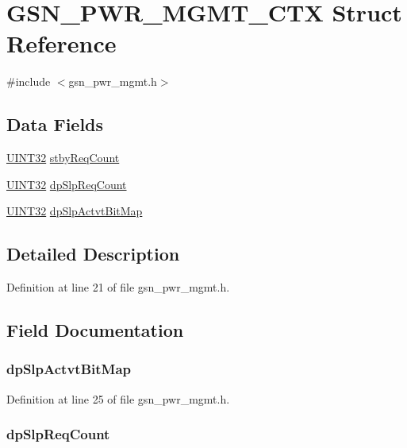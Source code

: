 \hypertarget{a00184}{
\section{GSN\_\-PWR\_\-MGMT\_\-CTX Struct Reference}
\label{a00184}
}


{\ttfamily \#include $<$gsn\_\-pwr\_\-mgmt.h$>$}

\subsection*{Data Fields}
\begin{DoxyCompactItemize}
\item 
\hyperlink{a00660_gae1e6edbbc26d6fbc71a90190d0266018}{UINT32} \hyperlink{a00184_ab6d7cdcd26cd0bfb2c69f920c1ad0737}{stbyReqCount}
\item 
\hyperlink{a00660_gae1e6edbbc26d6fbc71a90190d0266018}{UINT32} \hyperlink{a00184_a3bbab5d44f26e45a21a0b8a0927626f6}{dpSlpReqCount}
\item 
\hyperlink{a00660_gae1e6edbbc26d6fbc71a90190d0266018}{UINT32} \hyperlink{a00184_a582c3418fc7ee4c433ea83472eee9ba9}{dpSlpActvtBitMap}
\end{DoxyCompactItemize}


\subsection{Detailed Description}


Definition at line 21 of file gsn\_\-pwr\_\-mgmt.h.



\subsection{Field Documentation}
\hypertarget{a00184_a582c3418fc7ee4c433ea83472eee9ba9}{
\subsubsection[{dpSlpActvtBitMap}]{ {\bf dpSlpActvtBitMap}}}
\label{a00184_a582c3418fc7ee4c433ea83472eee9ba9}


Definition at line 25 of file gsn\_\-pwr\_\-mgmt.h.

\hypertarget{a00184_a3bbab5d44f26e45a21a0b8a0927626f6}{
\subsubsection[{dpSlpReqCount}]{ {\bf dpSlpReqCount}}}
\label{a00184_a3bbab5d44f26e45a21a0b8a0927626f6}


